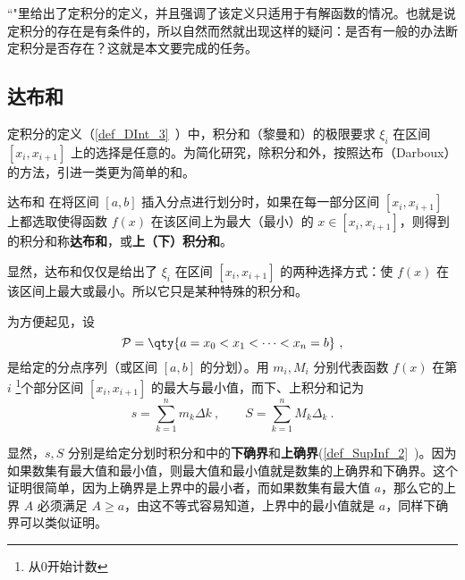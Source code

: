 
“"里给出了定积分的定义，并且强调了该定义只适用于有解函数的情况。也就是说定积分的存在是有条件的，所以自然而然就出现这样的疑问：是否有一般的办法断定积分是否存在？这就是本文要完成的任务。
\subsection{达布和}
定积分的定义（\autoref{def_DInt_3}~）中，积分和（黎曼和）的极限要求 $\xi_i$ 在区间 $[x_i,x_{i+1}]$ 上的选择是任意的。为简化研究，除积分和外，按照达布（Darboux）的方法，引进一类更为简单的和。
\begin{definition}{达布和}
在将区间 $[a,b]$ 插入分点进行划分时，如果在每一部分区间 $[x_i,x_{i+1}]$ 上都选取使得函数 $f(x)$ 在该区间上为最大（最小）的 $x\in[x_i,x_{i+1}]$，则得到的积分和称\textbf{达布和}，或\textbf{上（下）积分和}。
\end{definition}
显然，达布和仅仅是给出了 $\xi_i$ 在区间 $[x_i,x_{i+1}]$ 的两种选择方式：使 $f(x)$ 在该区间上最大或最小。所以它只是某种特殊的积分和。

为方便起见，设
\begin{equation}
\mathcal P = \qty{a = x_0 < x_1 < \dots < x_n = b}~,
\end{equation}
是给定的分点序列（或区间 $[a,b]$ 的分划）。用 $m_i,M_i$ 分别代表函数 $f(x)$ 在第 $i$ \footnote{从0开始计数}个部分区间 $[x_i,x_{i+1}]$ 的最大与最小值，而下、上积分和记为
\begin{equation}
s= \sum_{k = 1}^n m_k\Delta k~, \qquad  S = \sum_{k = 1}^n M_k \Delta_k~.
\end{equation}

显然，$s,S$ 分别是给定分划时积分和中的\textbf{下确界}和\textbf{上确界}(\autoref{def_SupInf_2}~)。因为如果数集有最大值和最小值，则最大值和最小值就是数集的上确界和下确界。这个证明很简单，因为上确界是上界中的最小者，而如果数集有最大值 $a$，那么它的上界 $A$ 必须满足 $A\geq a$，由这不等式容易知道，上界中的最小值就是 $a$，同样下确界可以类似证明。
